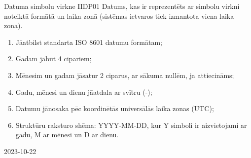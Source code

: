 {Datuma simbolu virkne}
{IIDP01}
{
	Datums, kas ir reprezentēts ar simbolu virkni noteiktā formātā un laika zonā (sistēmas ietvaros tiek izmantota viena laika zona).
}
{
	\begin{enumerate}
		\item Jāatbilst standarta ISO 8601 datumu formātam;
		\item Gadam jābūt 4 cipariem;
		\item Mēnesim un gadam jāsatur 2 ciparus, ar sākuma nullēm, ja attiecināms;
		\item Gadu, mēnesi un dienu jāatdala ar svītru (-);
		\item Datumu jānosaka pēc koordinētās universālās laika zonas (UTC);
		\item Struktūru raksturo shēma: YYYY-MM-DD, kur Y simboli ir aizvietojami ar gadu, M ar mēnesi un D ar dienu.
	\end{enumerate}
}
{
	2023-10-22
}
